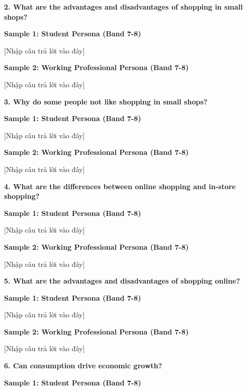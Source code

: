 \separator

\begin{ieltsquestion}
\textbf{2. What are the advantages and disadvantages of shopping in small shops?}
\end{ieltsquestion}
\textbf{Sample 1: Student Persona (Band 7-8)}

[Nhập câu trả lời vào đây]

\textbf{Sample 2: Working Professional Persona (Band 7-8)}

[Nhập câu trả lời vào đây]

\separator

\begin{ieltsquestion}
\textbf{3. Why do some people not like shopping in small shops?}
\end{ieltsquestion}
\textbf{Sample 1: Student Persona (Band 7-8)}

[Nhập câu trả lời vào đây]

\textbf{Sample 2: Working Professional Persona (Band 7-8)}

[Nhập câu trả lời vào đây]

\separator

\begin{ieltsquestion}
\textbf{4. What are the differences between online shopping and in-store shopping?}
\end{ieltsquestion}
\textbf{Sample 1: Student Persona (Band 7-8)}

[Nhập câu trả lời vào đây]

\textbf{Sample 2: Working Professional Persona (Band 7-8)}

[Nhập câu trả lời vào đây]

\separator

\begin{ieltsquestion}
\textbf{5. What are the advantages and disadvantages of shopping online?}
\end{ieltsquestion}
\textbf{Sample 1: Student Persona (Band 7-8)}

[Nhập câu trả lời vào đây]

\textbf{Sample 2: Working Professional Persona (Band 7-8)}

[Nhập câu trả lời vào đây]

\separator

\begin{ieltsquestion}
\textbf{6. Can consumption drive economic growth?}
\end{ieltsquestion}
\textbf{Sample 1: Student Persona (Band 7-8)}

